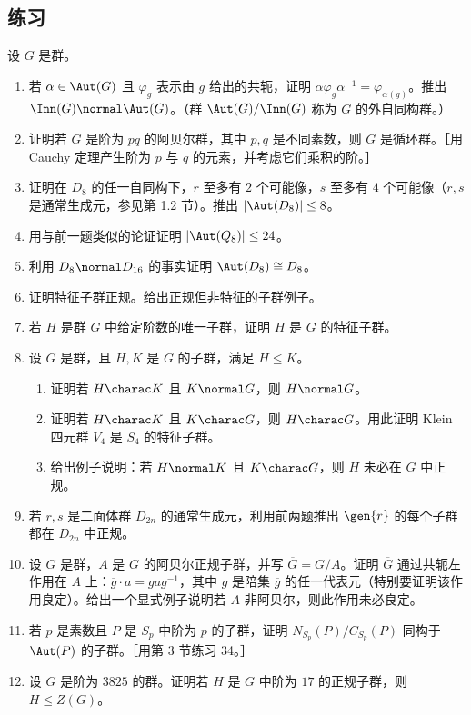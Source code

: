 \subsection*{练习}
设 $G$ 是群。
\begin{enumerate}[label=\arabic*.]
  \item 若 $\alpha\in\Aut(G)$ 且 $\varphi_g$ 表示由 $g$ 给出的共轭，证明 $\alpha\varphi_g\alpha^{-1}=\varphi_{\alpha(g)}$。推出 $\Inn(G)\normal\Aut(G)$。（群 $\Aut(G)/\Inn(G)$ 称为 $G$ 的外自同构群。）
  \item 证明若 $G$ 是阶为 $pq$ 的阿贝尔群，其中 $p,q$ 是不同素数，则 $G$ 是循环群。［用 Cauchy 定理产生阶为 $p$ 与 $q$ 的元素，并考虑它们乘积的阶。］
  \item 证明在 $D_8$ 的任一自同构下，$r$ 至多有 $2$ 个可能像，$s$ 至多有 $4$ 个可能像（$r,s$ 是通常生成元，参见第 1.2 节）。推出 $|\Aut(D_8)|\leq8$。
  \item 用与前一题类似的论证证明 $|\Aut(Q_8)|\leq24$。
  \item 利用 $D_8\normal D_{16}$ 的事实证明 $\Aut(D_8)\cong D_8$。
  \item 证明特征子群正规。给出正规但非特征的子群例子。
  \item 若 $H$ 是群 $G$ 中给定阶数的唯一子群，证明 $H$ 是 $G$ 的特征子群。
  \item 设 $G$ 是群，且 $H,K$ 是 $G$ 的子群，满足 $H\leq K$。
  \begin{enumerate}[label=(\alph*)]
    \item 证明若 $H\charac K$ 且 $K\normal G$，则 $H\normal G$。
    \item 证明若 $H\charac K$ 且 $K\charac G$，则 $H\charac G$。用此证明 Klein 四元群 $V_4$ 是 $S_4$ 的特征子群。
    \item 给出例子说明：若 $H\normal K$ 且 $K\charac G$，则 $H$ 未必在 $G$ 中正规。
  \end{enumerate}
  \item 若 $r,s$ 是二面体群 $D_{2n}$ 的通常生成元，利用前两题推出 $\gen{r}$ 的每个子群都在 $D_{2n}$ 中正规。
  \item 设 $G$ 是群，$A$ 是 $G$ 的阿贝尔正规子群，并写 $\overline G=G/A$。证明 $\overline G$ 通过共轭左作用在 $A$ 上：$\overline g\cdot a=gag^{-1}$，其中 $g$ 是陪集 $\overline g$ 的任一代表元（特别要证明该作用良定）。给出一个显式例子说明若 $A$ 非阿贝尔，则此作用未必良定。
  \item 若 $p$ 是素数且 $P$ 是 $S_p$ 中阶为 $p$ 的子群，证明 $N_{S_p}(P)/C_{S_p}(P)$ 同构于 $\Aut(P)$ 的子群。［用第 3 节练习 34。］
  \item 设 $G$ 是阶为 $3825$ 的群。证明若 $H$ 是 $G$ 中阶为 $17$ 的正规子群，则 $H\leq Z(G)$。

\end{enumerate}
